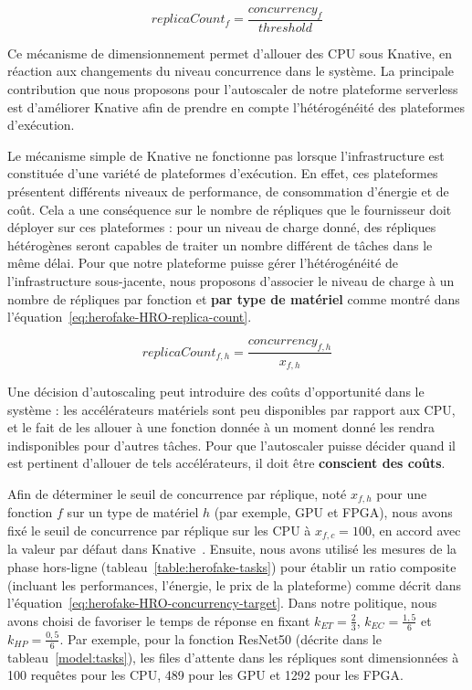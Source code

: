 \begin{equation}
    replicaCount_{f} = \frac{concurrency_{f}}{threshold}
\label{eq:herofake-kn-replica-count}
\end{equation}

Ce mécanisme de dimensionnement permet d'allouer des CPU sous Knative, en réaction aux changements du niveau concurrence dans le système. La principale contribution que nous proposons pour l'autoscaler de notre plateforme serverless est d'améliorer Knative afin de prendre en compte l'hétérogénéité des plateformes d'exécution.

Le mécanisme simple de Knative ne fonctionne pas lorsque l'infrastructure est constituée d'une variété de plateformes d'exécution. En effet, ces plateformes présentent différents niveaux de performance, de consommation d'énergie et de coût. Cela a une conséquence sur le nombre de répliques que le fournisseur doit déployer sur ces plateformes : pour un niveau de charge donné, des répliques hétérogènes seront capables de traiter un nombre différent de tâches dans le même délai. Pour que notre plateforme puisse gérer l'hétérogénéité de l'infrastructure sous-jacente, nous proposons d'associer le niveau de charge à un nombre de répliques par fonction et \textbf{par type de matériel} comme montré dans l'équation~\ref{eq:herofake-HRO-replica-count}.

\begin{equation}
    replicaCount_{f, h} = \frac{concurrency_{f, h}}{x_{f, h}}
\label{eq:herofake-HRO-replica-count}
\end{equation}

Une décision d'autoscaling peut introduire des coûts d'opportunité dans le système : les accélérateurs matériels sont peu disponibles par rapport aux CPU, et le fait de les allouer à une fonction donnée à un moment donné les rendra indisponibles pour d'autres tâches. Pour que l'autoscaler puisse décider quand il est pertinent d'allouer de tels accélérateurs, il doit être \textbf{conscient des coûts}.

Afin de déterminer le seuil de concurrence par réplique, noté $x_{f, h}$ pour une fonction $f$ sur un type de matériel $h$ (par exemple, GPU et FPGA), nous avons fixé le seuil de concurrence par réplique sur les CPU à $x_{f, c} = 100$, en accord avec la valeur par défaut dans Knative~\cite{knative-concurrency}. Ensuite, nous avons utilisé les mesures de la phase hors-ligne (tableau~\ref{table:herofake-tasks}) pour établir un ratio composite (incluant les performances, l'énergie, le prix de la plateforme) comme décrit dans l'équation~\ref{eq:herofake-HRO-concurrency-target}. Dans notre politique, nous avons choisi de favoriser le temps de réponse en fixant $k_{ET} = \frac{2}{3}$, $k_{EC} = \frac{1,5}{6}$ et $k_{HP} = \frac{0,5}{6}$. Par exemple, pour la fonction ResNet50 (décrite dans le tableau~\ref{model:tasks}), les files d'attente dans les répliques sont dimensionnées à 100 requêtes pour les CPU, 489 pour les GPU et 1292 pour les FPGA.


